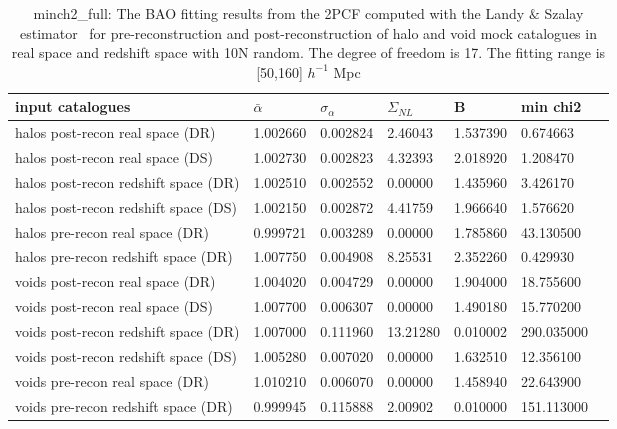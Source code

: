 \begin{table*}
\caption{minch2\_full: The BAO fitting results from the 2PCF computed with the Landy $\&$ Szalay estimator~\cite{Landy1993} for pre-reconstruction and  post-reconstruction of halo and void mock catalogues in real space and redshift space with 10N random. The degree of freedom is 17. The fitting range is [50,160] $h^{-1}$ Mpc}
\label{tab:LS}
\begin{tabular}{lllllll}
\hline
input catalogues                     &$\bar{\alpha}$&$\sigma_{\alpha}$&     $\Sigma_{NL}$ &        B &  min chi2 \\
\hline
halos post-recon real space (DR)     & 1.002660 & 0.002824 &  2.46043 & 1.537390 &   0.674663 \\
halos post-recon real space (DS)     & 1.002730 & 0.002823 &  4.32393 & 2.018920 &   1.208470 \\
halos post-recon redshift space (DR) & 1.002510 & 0.002552 &  0.00000 & 1.435960 &   3.426170 \\
halos post-recon redshift space (DS) & 1.002150 & 0.002872 &  4.41759 & 1.966640 &   1.576620 \\
halos pre-recon real space (DR)      & 0.999721 & 0.003289 &  0.00000 & 1.785860 &  43.130500 \\
halos pre-recon redshift space (DR)  & 1.007750 & 0.004908 &  8.25531 & 2.352260 &   0.429930 \\
\hline
voids post-recon real space (DR)     & 1.004020 & 0.004729 &  0.00000 & 1.904000 &  18.755600 \\
voids post-recon real space (DS)     & 1.007700 & 0.006307 &  0.00000 & 1.490180 &  15.770200 \\
voids post-recon redshift space (DR) & 1.007000 & 0.111960 & 13.21280 & 0.010002 & 290.035000 \\
voids post-recon redshift space (DS) & 1.005280 & 0.007020 &  0.00000 & 1.632510 &  12.356100 \\
voids pre-recon real space (DR)      & 1.010210 & 0.006070 &  0.00000 & 1.458940 &  22.643900 \\
voids pre-recon redshift space (DR)  & 0.999945 & 0.115888 &  2.00902 & 0.010000 & 151.113000 \\
\hline
\end{tabular}
\end{table*}

